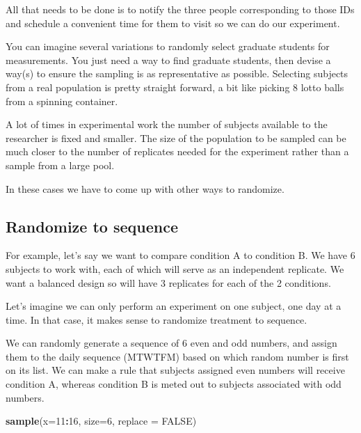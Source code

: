 \documentclass[]{book}
\newenvironment{Shaded}{\begin{snugshade}}{\end{snugshade}}
\newcommand{\DataTypeTok}[1]{\textcolor[rgb]{0.13,0.29,0.53}{#1}}
\newcommand{\DecValTok}[1]{\textcolor[rgb]{0.00,0.00,0.81}{#1}}
\newcommand{\KeywordTok}[1]{\textcolor[rgb]{0.13,0.29,0.53}{\textbf{#1}}}
\newcommand{\NormalTok}[1]{#1}
\newcommand{\OperatorTok}[1]{\textcolor[rgb]{0.81,0.36,0.00}{\textbf{#1}}}
\newcommand{\OtherTok}[1]{\textcolor[rgb]{0.56,0.35,0.01}{#1}}
\begin{document}
All that needs to be done is to notify the three people corresponding to those IDs and schedule a convenient time for them to visit so we can do our experiment.

You can imagine several variations to randomly select graduate students for measurements. You just need a way to find graduate students, then devise a way(s) to ensure the sampling is as representative as possible. Selecting subjects from a real population is pretty straight forward, a bit like picking 8 lotto balls from a spinning container.

A lot of times in experimental work the number of subjects available to the researcher is fixed and smaller. The size of the population to be sampled can be much closer to the number of replicates needed for the experiment rather than a sample from a large pool.

In these cases we have to come up with other ways to randomize.

\hypertarget{randomize-to-sequence}{%
\subsection{Randomize to sequence}\label{randomize-to-sequence}}

For example, let's say we want to compare condition A to condition B. We have 6 subjects to work with, each of which will serve as an independent replicate. We want a balanced design so will have 3 replicates for each of the 2 conditions.

Let's imagine we can only perform an experiment on one subject, one day at a time. In that case, it makes sense to randomize treatment to sequence.

We can randomly generate a sequence of 6 even and odd numbers, and assign them to the daily sequence (MTWTFM) based on which random number is first on its list. We can make a rule that subjects assigned even numbers will receive condition A, whereas condition B is meted out to subjects associated with odd numbers.

\begin{Shaded}
\begin{Highlighting}[]
\KeywordTok{sample}\NormalTok{(}\DataTypeTok{x=}\DecValTok{11}\OperatorTok{:}\DecValTok{16}\NormalTok{, }\DataTypeTok{size=}\DecValTok{6}\NormalTok{, }\DataTypeTok{replace =} \OtherTok{FALSE}\NormalTok{)}
\end{Highlighting}
\end{Shaded}
\end{document}

